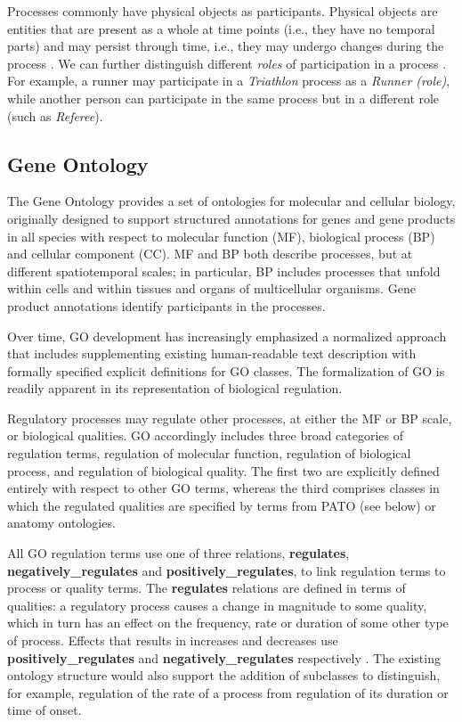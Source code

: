 \documentclass[12pt]{article}
\renewcommand{\cite}{\citep}
\begin{document}
Processes commonly have physical objects as participants. Physical
objects are entities that are present as a whole at time points (i.e.,
they have no temporal parts) and may persist through time, i.e., they
may undergo changes during the process \cite{Herre2006, Herre2010}.
We can further distinguish different {\em roles} of participation in a
process \cite{Loebe2007}. For example, a runner may participate in a
{\em Triathlon} process as a {\em Runner (role)}, while another person
can participate in the same process but in a different role (such as
{\em Referee}).


\subsection{Gene Ontology}
The Gene Ontology provides a set of ontologies for molecular and
cellular biology, originally designed to support structured
annotations for genes and gene products in all species with respect to
molecular function (MF), biological process (BP) and cellular
component (CC). MF and BP both describe processes, but at different
spatiotemporal scales; in particular, BP includes processes that
unfold within cells and within tissues and organs of multicellular
organisms. Gene product annotations identify participants in the
processes.

Over time, GO development has increasingly emphasized a normalized
approach that includes supplementing existing human-readable text
description with formally specified explicit definitions for GO
classes. The formalization of GO is readily apparent in its
representation of biological regulation.

Regulatory processes may regulate other processes, at either the MF or
BP scale, or biological qualities. GO accordingly includes three broad
categories of regulation terms, regulation of molecular function,
regulation of biological process, and regulation of biological
quality. The first two are explicitly defined entirely with respect to
other GO terms, whereas the third comprises classes in which the
regulated qualities are specified by terms from PATO (see below) or
anatomy ontologies.

All GO regulation terms use one of three relations, {\bf regulates},
{\bf negatively\_regulates} and {\bf positively\_regulates}, to link
regulation terms to process or quality terms. The {\bf regulates}
relations are defined in terms of qualities: a regulatory process
causes a change in magnitude to some quality, which in turn has an
effect on the frequency, rate or duration of some other type of
process. Effects that results in increases and decreases use {\bf
  positively\_regulates} and {\bf negatively\_regulates} respectively
\cite{Mungall2010go}. The existing ontology structure would also
support the addition of subclasses to distinguish, for example,
regulation of the rate of a process from regulation of its duration or
time of onset.
\end{document}
